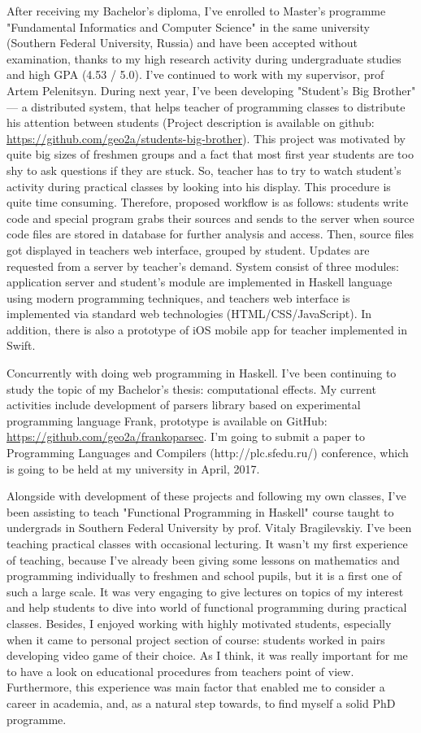 \documentclass[11pt,a4paper,sans]{moderncv} %
\begin{document}
After receiving my Bachelor's diploma, I've enrolled to Master's
programme "Fundamental Informatics and Computer Science" in the same university 
(Southern Federal University, Russia) and have been accepted without
examination, thanks to my high research activity during undergraduate studies
and high GPA (4.53 / 5.0). I've continued to work with my supervisor, 
prof Artem Pelenitsyn. During next year, I've been developing
"Student's Big Brother" --- a distributed system, that helps teacher of 
programming classes to distribute his attention between students 
(Project description is available on github:
\url{https://github.com/geo2a/students-big-brother}). This project was motivated
by quite big sizes of freshmen groups and a fact that most first year students 
are too shy to ask questions if they are stuck. So, teacher has to try to watch
student's activity during practical classes by looking into his display. This
procedure is quite time consuming. Therefore, proposed workflow is as follows:
students write code and special program grabs their sources and sends to the
server when source code files are stored in database for further analysis and
access. Then, source files got displayed in teachers web interface, grouped by
student. Updates are requested from a server by teacher's demand. System consist
of three modules: application server and student's module are implemented in
Haskell language using modern programming techniques, and teachers web interface
is implemented via standard web technologies (HTML/CSS/JavaScript). In addition,
there is also a prototype of iOS mobile app for teacher implemented in Swift.  

Concurrently with doing web programming in Haskell. I've been continuing to
study the topic of my Bachelor's thesis: computational effects. My current
activities include development of parsers library based on experimental
programming language Frank, prototype is available on GitHub: 
\url{https://github.com/geo2a/frankoparsec}. I'm going to submit a paper to
Programming Languages and Compilers (http://plc.sfedu.ru/) conference, 
which is going to be held at my university in April, 2017.  

Alongside with development of these projects and following my own classes, 
I've been assisting to teach "Functional Programming in Haskell" course taught 
to undergrads in Southern Federal University by prof. Vitaly Bragilevskiy. 
I've been teaching practical classes with occasional lecturing.
It wasn't my first experience of teaching, because I've already been
giving some lessons on mathematics and programming individually to freshmen 
and school pupils, but it is a first one of such a large scale. 
It was very engaging to give lectures on topics of my interest and
help students to dive into world of functional programming during practical 
classes. Besides, I enjoyed working with highly motivated students, 
especially when it came to personal project section of course:
students worked in pairs developing video game of their choice. 
As I think, it was really important for me to have a look on educational 
procedures from teachers point of view. Furthermore, this experience was main
factor that enabled me to consider a career in academia, and, as a natural step
towards, to find myself a solid PhD programme.
\end{document}
